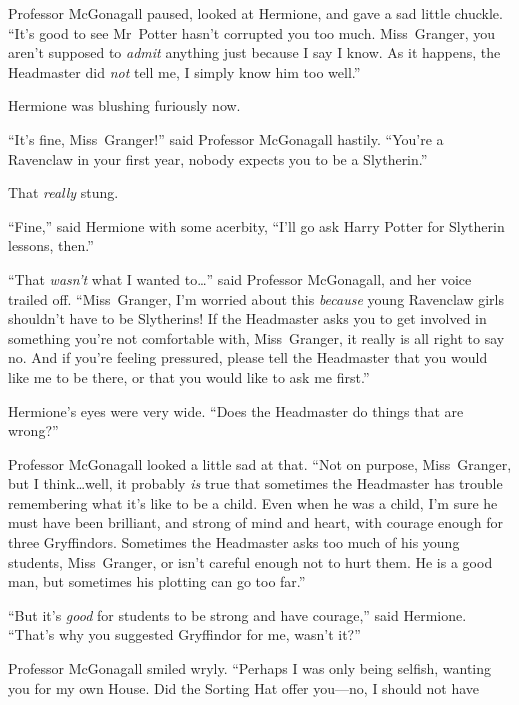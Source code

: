 Professor McGonagall paused, looked at Hermione, and gave a sad little chuckle. “It’s good to see Mr~Potter hasn’t corrupted you too much. Miss~Granger, you aren’t supposed to \emph{admit} anything just because I say I know. As it happens, the Headmaster did \emph{not} tell me, I simply know him too well.”

Hermione was blushing furiously now.

“It’s fine, Miss~Granger!” said Professor McGonagall hastily. “You’re a Ravenclaw in your first year, nobody expects you to be a Slytherin.”

That \emph{really} stung.

“Fine,” said Hermione with some acerbity, “I’ll go ask Harry Potter for Slytherin lessons, then.”

“That \emph{wasn’t} what I wanted to…” said Professor McGonagall, and her voice trailed off. “Miss~Granger, I’m worried about this \emph{because} young Ravenclaw girls shouldn’t have to be Slytherins! If the Headmaster asks you to get involved in something you’re not comfortable with, Miss~Granger, it really is all right to say no. And if you’re feeling pressured, please tell the Headmaster that you would like me to be there, or that you would like to ask me first.”

Hermione’s eyes were very wide. “Does the Headmaster do things that are wrong?”

Professor McGonagall looked a little sad at that. “Not on purpose, Miss~Granger, but I think…well, it probably \emph{is} true that sometimes the Headmaster has trouble remembering what it’s like to be a child. Even when he was a child, I’m sure he must have been brilliant, and strong of mind and heart, with courage enough for three Gryffindors. Sometimes the Headmaster asks too much of his young students, Miss~Granger, or isn’t careful enough not to hurt them. He is a good man, but sometimes his plotting can go too far.”

“But it’s \emph{good} for students to be strong and have courage,” said Hermione. “That’s why you suggested Gryffindor for me, wasn’t it?”

Professor McGonagall smiled wryly. “Perhaps I was only being selfish, wanting you for my own House. Did the Sorting Hat offer you—no, I should not have asked.”

“It told me I might go anywhere but Slytherin,” said Hermione. She’d \emph{almost} asked why she wasn’t good enough for Slytherin, before she’d managed to stop herself… “So I \emph{have} courage, Professor!”

